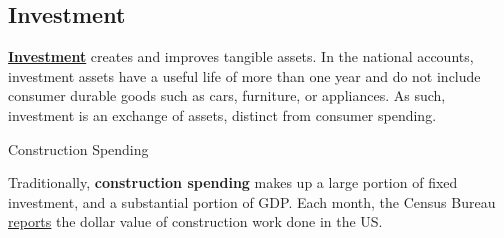 \subsection*{Investment}
\begin{minipage}{0.76\textwidth}
   

\small \textbf{\href{https://www.bea.gov/resources/learning-center/what-to-know-fixed-assets}{Investment}} creates and improves tangible assets. In the national accounts, investment assets have a useful life of more than one year and do not include consumer durable goods such as cars, furniture, or appliances. As such, investment is an exchange of assets, distinct from consumer spending. 

 


\vspace{0.5mm}

\vspace{-5mm}

\vspace{4mm}

\normalsize Construction Spending
\vspace{-1mm}

\small Traditionally, \textbf{construction spending} makes up a large portion of fixed investment, and a substantial portion of GDP. Each month, the Census Bureau \href{https://www.census.gov/construction/c30/c30index.html}{reports} the dollar value of construction work done in the US. 
\end{minipage}
\vspace{0.5mm}


